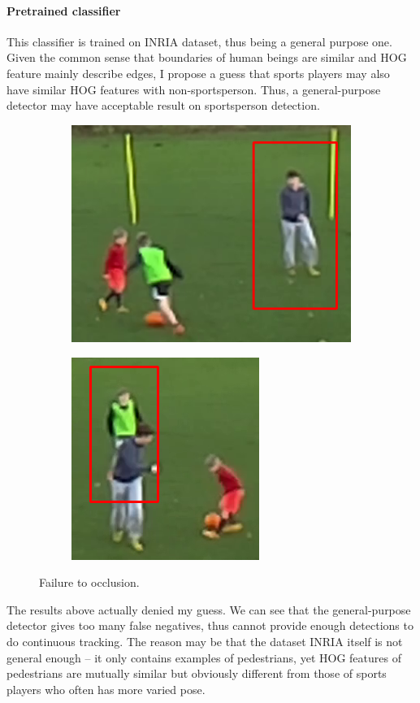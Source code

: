 \documentclass{article}
\begin{document}
\paragraph{Pretrained classifier}
This classifier is trained on INRIA dataset, thus being a general purpose one. Given the common sense that boundaries of human beings are similar and HOG feature mainly describe edges, I propose a guess that sports players may also have similar HOG features with non-sportsperson. Thus, a general-purpose detector may have acceptable result on sportsperson detection.\\
\begin{figure}[h!]
  \centering
  \begin{subfigure}[b]{0.4\linewidth}
    \includegraphics[scale=0.4]{report/pic/3/vulnerability_to_occlusion_1.png} 
  \end{subfigure}\hspace{5mm}
  \begin{subfigure}[b]{0.4\linewidth}
    \includegraphics[scale=0.5]{report/pic/3/vulnerbility_to_occlusion_2.png} 
  \end{subfigure}
  \caption{Failure to occlusion.}
\end{figure}
The results above actually denied my guess. We can see that the general-purpose detector gives too many false negatives, thus cannot provide enough detections to do continuous tracking. The reason may be that the dataset INRIA itself is not general enough – it only contains examples of pedestrians, yet HOG features of pedestrians are mutually similar but obviously different from those of sports players who often has more varied pose.
\end{document}
